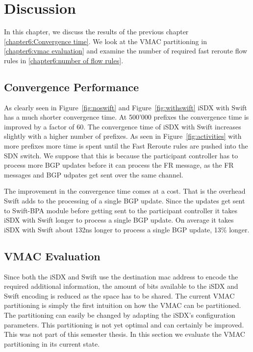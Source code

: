 \chapter{\label{chapter6}Discussion}


In this chapter, we discuss the results of the previous chapter \ref{chapter6:Convergence time}. We look at the VMAC partitioning in \ref{chapter6:vmac evaluation} and examine the number of required fast reroute flow rules in \ref{chapter6:number of flow rules}.

\section{\label{chapter6:Convergence time}Convergence Performance}

As clearly seen in Figure~\ref{fig:noswift} and Figure~\ref{fig:withswift} iSDX with Swift has a much shorter convergence time. At 500'000 prefixes the convergence time is improved by a factor of 60. The convergence time of iSDX with Swift increases slightly with a higher number of prefixes. As seen in Figure~\ref{fig:activities} with more prefixes more time is spent until the Fast Reroute rules are pushed into the SDN switch. We suppose that this is because the participant controller has to process more BGP updates before it can process the FR message, as the FR messages and BGP udpates get sent over the same channel.

The improvement in the convergence time comes at a cost. That is the overhead Swift adds to the processing of a single BGP update. Since the updates get sent to Swift-BPA module before getting sent to the participant controller it takes iSDX with Swift longer to process a single BGP update. On average it takes iSDX with Swift about 132ns longer to process a single BGP update, 13\% longer. 

\section{\label{chapter6:vmac evaluation}VMAC Evaluation}

Since both the iSDX and Swift use the destination mac address to encode the required additional information, the amount of bits available to the iSDX and Swift encoding is reduced as the space has to be shared. The current VMAC partitioning is simply the first intuition on how the VMAC can be partitioned. The partitioning can easily be changed by adapting the iSDX's configuration parameters. This partitioning is not yet optimal and can certainly be improved. This was not part of this semester thesis. In this section we evaluate the VMAC partitioning in its current state.


